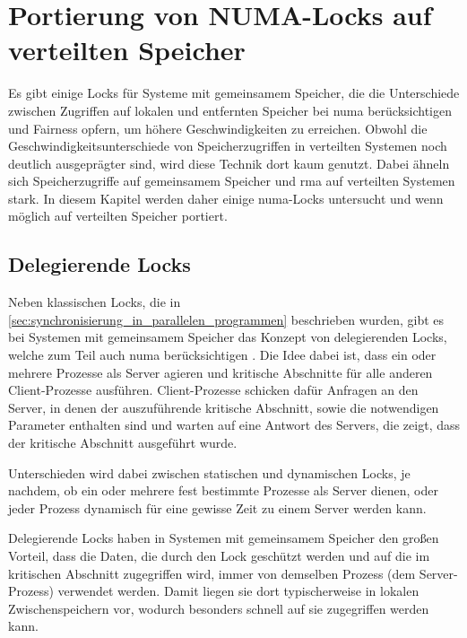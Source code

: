 \chapter{Portierung von NUMA-Locks auf verteilten Speicher}
\label{ch:portierung}

Es gibt einige Locks für Systeme mit gemeinsamem Speicher,
die die Unterschiede zwischen Zugriffen auf lokalen und entfernten Speicher bei \gls{numa} berücksichtigen
und Fairness opfern,
um höhere Geschwindigkeiten zu erreichen.
Obwohl die Geschwindigkeitsunterschiede von Speicherzugriffen in verteilten Systemen noch deutlich ausgeprägter sind,
wird diese Technik dort kaum genutzt.
Dabei ähneln sich Speicherzugriffe auf gemeinsamem Speicher und \gls{rma} auf verteilten Systemen stark.
In diesem Kapitel werden daher einige \gls{numa}-Locks untersucht
und wenn möglich auf verteilten Speicher portiert.

\section{Delegierende Locks}
\label{sec:delegation_locks}

Neben klassischen Locks,
die in \autoref{sec:synchronisierung_in_parallelen_programmen} beschrieben wurden,
gibt es bei Systemen mit gemeinsamem Speicher das Konzept von delegierenden Locks,
welche zum Teil auch \gls{numa} berücksichtigen \cite{OyamaAlg} \cite{FlatCombining} \cite{P-Sim} \cite{H-Sync} \cite{RCL} \cite{shared-mem-delegation} \cite{SANL} \cite{DYLOCK}.
Die Idee dabei ist,
dass ein oder mehrere Prozesse als Server agieren
und kritische Abschnitte für alle anderen Client-Prozesse ausführen.
Client-Prozesse schicken dafür Anfragen an den Server,
in denen der auszuführende kritische Abschnitt,
sowie die notwendigen Parameter enthalten sind
und warten auf eine Antwort des Servers,
die zeigt,
dass der kritische Abschnitt ausgeführt wurde.

Unterschieden wird dabei zwischen statischen und dynamischen Locks,
je nachdem,
ob ein oder mehrere fest bestimmte Prozesse als Server dienen,
oder jeder Prozess dynamisch für eine gewisse Zeit zu einem Server werden kann.

Delegierende Locks haben in Systemen mit gemeinsamem Speicher den großen Vorteil,
dass die Daten,
die durch den Lock geschützt werden
und auf die im kritischen Abschnitt zugegriffen wird,
immer von demselben Prozess (dem Server-Prozess) verwendet werden.
Damit liegen sie dort typischerweise in lokalen \gls{Zwischenspeicher}n vor,
wodurch besonders schnell auf sie zugegriffen werden kann.

